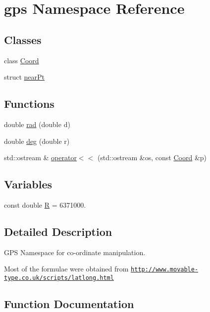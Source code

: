 \hypertarget{namespacegps}{}\section{gps Namespace Reference}
\label{namespacegps}
\subsection*{Classes}
\begin{DoxyCompactItemize}
\item 
class \hyperlink{classgps_1_1Coord}{Coord}
\item 
struct \hyperlink{structgps_1_1nearPt}{near\+Pt}
\end{DoxyCompactItemize}
\subsection*{Functions}
\begin{DoxyCompactItemize}
\item 
double \hyperlink{namespacegps_ad44ea39876137fc96774486e3a60f004}{rad} (double d)
\item 
double \hyperlink{namespacegps_a5c00877fe5fce323f1c834c324018c8f}{deg} (double r)
\item 
std\+::ostream \& \hyperlink{namespacegps_a5fb543469635387159ce1b8e24f6f78a}{operator$<$$<$} (std\+::ostream \&os, const \hyperlink{classgps_1_1Coord}{Coord} \&p)
\end{DoxyCompactItemize}
\subsection*{Variables}
\begin{DoxyCompactItemize}
\item 
const double \hyperlink{namespacegps_a336bcadf804afba736e0cf773b5a36e8}{R} = 6371000.
\end{DoxyCompactItemize}


\subsection{Detailed Description}
G\+PS Namespace for co-\/ordinate manipulation.

Most of the formulae were obtained from \href{http://www.movable-type.co.uk/scripts/latlong.html}{\tt http\+://www.\+movable-\/type.\+co.\+uk/scripts/latlong.\+html} 

\subsection{Function Documentation}
\mbox{\label{namespacegps_a5c00877fe5fce323f1c834c324018c8f}} 
